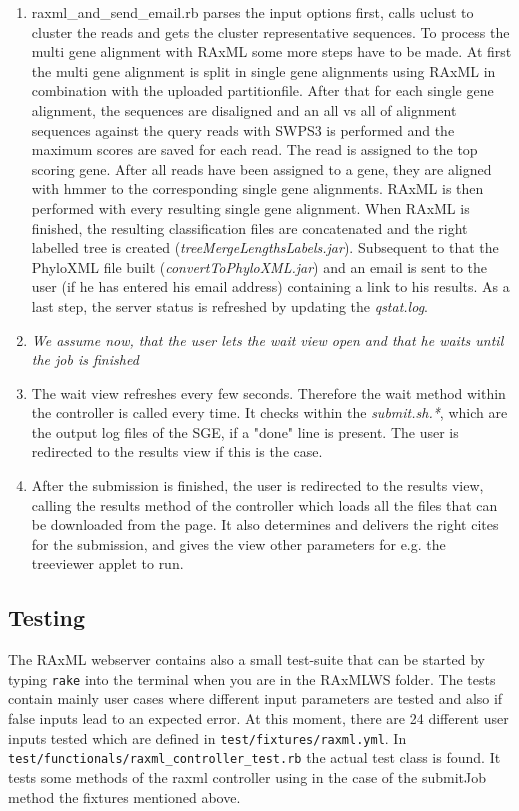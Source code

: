 \documentclass{scrartcl}
\begin{document}
\begin{enumerate}
					\item raxml\_and\_send\_email.rb parses the input options first, calls uclust to cluster the reads and gets the cluster representative sequences. To process the multi gene alignment with RAxML some more steps have to be made. At first the multi gene alignment is split in single gene alignments using RAxML in combination with the uploaded partitionfile. After that for each single gene alignment, the sequences are disaligned and an all vs all of alignment sequences against the query reads with SWPS3 is performed and the maximum scores are saved for each read. The read is assigned to the top scoring gene. After all reads have been assigned to a gene, they are aligned with hmmer to the corresponding single gene alignments. RAxML is then performed with every resulting single gene alignment. When RAxML is finished, the resulting classification files are concatenated and the right labelled tree is created (\textit{treeMergeLengthsLabels.jar}). Subsequent to that the PhyloXML file built (\textit{convertToPhyloXML.jar}) and an email is sent to the user (if he has entered his email address) containing a link to his results. As a last step, the server status is refreshed by updating the \textit{qstat.log}. 
					\item \textit{We assume now, that the user lets the wait view open and that he waits until the job is finished}
					\item The wait view refreshes every few seconds. Therefore the wait method within the controller is called every time. It checks within the \textit{submit.sh.*}, which are the output log files of the SGE, if a "done" line is present. The user is redirected to the results view if this is the case.
					\item After the submission is finished, the user is redirected to the results view, calling the results method of the controller which loads all the files that can be downloaded from the page. It also determines and delivers the right cites for the submission, and gives the view other parameters for e.g. the treeviewer applet to run.
				\end{enumerate} 
				
		\subsection{Testing}
			The RAxML webserver contains also a small test-suite that can be started by typing \texttt{rake} into the terminal when you are in the RAxMLWS folder. The tests contain mainly user cases where different input parameters are tested and also if false inputs lead to an expected error. At this moment, there are 24 different user inputs tested which are defined in \texttt{test/fixtures/raxml.yml}. In \texttt{test/functionals/raxml\_controller\_test.rb} the actual test class is found. It tests some methods of the raxml controller using in the case of the submitJob method the fixtures mentioned above.
\end{document}

